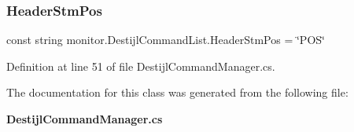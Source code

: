 \mbox{\label{classmonitor_1_1_destijl_command_list_abf99a718161a5a9017d7011cea429ec0}} 
\subsubsection{Header\+Stm\+Pos}
{\footnotesize\ttfamily const string monitor.\+Destijl\+Command\+List.\+Header\+Stm\+Pos = \char`\"{}P\+OS\char`\"{}}



Definition at line 51 of file Destijl\+Command\+Manager.\+cs.



The documentation for this class was generated from the following file\+:\begin{DoxyCompactItemize}
\item 
\textbf{ Destijl\+Command\+Manager.\+cs}\end{DoxyCompactItemize}
